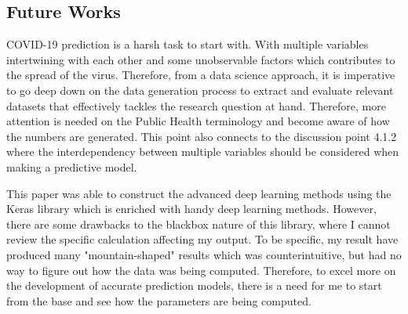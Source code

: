 \subsection{Future Works}
COVID-19 prediction is a harsh task to start with. With multiple variables intertwining with each other and some unobservable factors which contributes to the spread of the virus. Therefore, from a data science approach, it is imperative to go deep down on the data generation process to extract and evaluate relevant datasets that effectively tackles the research question at hand. Therefore, more attention is needed on the Public Health terminology and become aware of how the numbers are generated. This point also connects to the discussion point 4.1.2 where the interdependency between multiple variables should be considered when making a predictive model. 

This paper was able to construct the advanced deep learning methods using the Keras library \citep{keras} which is enriched with handy deep learning methods. However, there are some drawbacks to the blackbox nature of this library, where I cannot review the specific calculation affecting my output. To be specific, my result have produced many "mountain-shaped" results which was counterintuitive, but had no way to figure out how the data was being computed. Therefore, to excel more on the development of accurate prediction models, there is a need for me to start from the base and see how the parameters are being computed. 